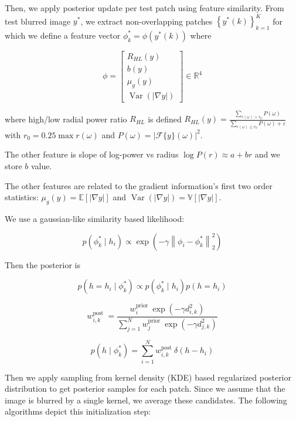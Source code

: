 \documentclass{article}
\theoremstyle{definition}
\begin{document}
Then, we apply posterior update per test patch using feature similarity. From test blurred image $y^*$, we extract non-overlapping patches $\left\{y^*(k)\right\}_{k=1}^K$ for which we define a feature vector $\phi_k^{*}=\phi\left(y^{*}(k)\right)$ where 


$$
\phi=\left[\begin{array}{c}
R_{H L}(y) \\
b(y) \\
\mu_g(y) \\
\operatorname{Var}(|\nabla y|)
\end{array}\right] \in \mathbb{R}^4
$$

where high/low radial power ratio $R_{HL}$ is defined $R_{H L}(y)=\frac{\sum_{r(\omega)>r_0} P(\omega)}{\sum_{r(\omega) \leq r_0} P(\omega)+\varepsilon}$ with $r_0=0.25 \max r(\omega)$ and $P(\omega)=|\mathcal{F}\{y\}(\omega)|^2$. 


The other feature is  slope of log-power vs radius $\log P(r) \approx a+b r$ and we store $b$ value.

The other features are related to the gradient information's first two order statistics: $\mu_g(y)=\mathbb{E}[|\nabla y|]$  and $\operatorname{Var}(|\nabla y|)=\mathbb{V}[|\nabla y|]$. 

We use a gaussian-like similarity based likelihood:

$$
p\left(\phi_k^* \mid h_i\right) \propto \exp \left(-\gamma\left\|\phi_i-\phi_k^{*}\right\|_2^2\right)
$$

Then the posterior is 


$$
p\left(h=h_i \mid \phi_k^{*}\right) \propto p\left(\phi_k^{*} \mid h_i\right) p\left(h=h_i\right)
$$



$$
w_{i, k}^{\text {post }}=\frac{w_i^{\text {prior }} \exp \left(-\gamma d_{i, k}^2\right)}{\sum_{j=1}^N w_j^{\text {prior }} \exp \left(-\gamma d_{j, k}^2\right)}
$$



$$
p\left(h \mid \phi_k^*\right)=\sum_{i=1}^N w_{i, k}^{\text {post }} \delta\left(h-h_i\right)
$$


Then we apply sampling from kernel density (KDE)  based regularized posterior distribution to get posterior samples for each patch. Since we assume that the image is blurred by a single kernel, we average these candidates. The following algorithms depict this initialization step:
\end{document}
